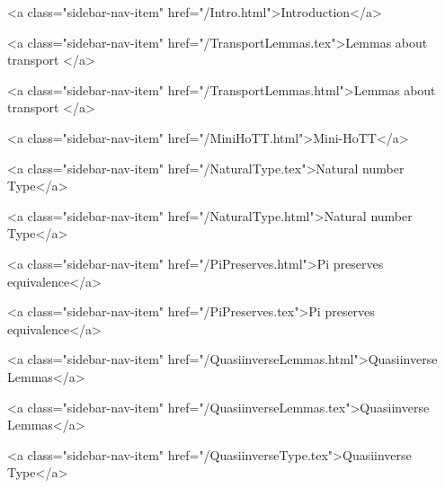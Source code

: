       
    
      
        
          <a class="sidebar-nav-item" href="/Intro.html">Introduction</a>
        
      
    
      
        
          <a class="sidebar-nav-item" href="/TransportLemmas.tex">Lemmas about transport </a>
        
      
    
      
        
          <a class="sidebar-nav-item" href="/TransportLemmas.html">Lemmas about transport </a>
        
      
    
      
        
          <a class="sidebar-nav-item" href="/MiniHoTT.html">Mini-HoTT</a>
        
      
    
      
        
          <a class="sidebar-nav-item" href="/NaturalType.tex">Natural number Type</a>
        
      
    
      
        
          <a class="sidebar-nav-item" href="/NaturalType.html">Natural number Type</a>
        
      
    
      
        
          <a class="sidebar-nav-item" href="/PiPreserves.html">Pi preserves equivalence</a>
        
      
    
      
        
          <a class="sidebar-nav-item" href="/PiPreserves.tex">Pi preserves equivalence</a>
        
      
    
      
        
          <a class="sidebar-nav-item" href="/QuasiinverseLemmas.html">Quasiinverse Lemmas</a>
        
      
    
      
        
          <a class="sidebar-nav-item" href="/QuasiinverseLemmas.tex">Quasiinverse Lemmas</a>
        
      
    
      
        
          <a class="sidebar-nav-item" href="/QuasiinverseType.tex">Quasiinverse Type</a>
        
